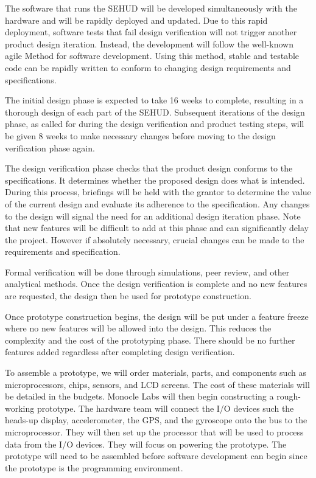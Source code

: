 The software that runs the SEHUD will be developed simultaneously with the
hardware and will be rapidly deployed and updated. Due to this rapid
deployment, software tests that fail design verification will not trigger
another product design iteration. Instead, the development will follow the
well-known agile Method for software development. Using this method, stable
and testable code can be rapidly written to conform to changing design
requirements and specifications.

The initial design phase is expected to take 16 weeks to complete, resulting
in a thorough design of each part of the SEHUD. Subsequent iterations of the
design phase, as called for during the design verification and product
testing steps, will be given 8 weeks to make necessary changes before moving
to the design verification phase again.


The design verification phase checks that the product design conforms to the
specifications. It determines whether the proposed design does what is
intended. During this process, briefings will be held with the grantor to
determine the value of the current design and evaluate its adherence to the
specification. Any changes to the design will signal the need for an
additional design iteration phase. Note that new features will be difficult
to add at this phase and can significantly delay the project. However if
absolutely necessary, crucial changes can be made to the requirements and
specification.

Formal verification will be done through simulations, peer review, and other
analytical methods. Once the design verification is complete and no new
features are requested, the design then be used for prototype construction.


Once prototype construction begins, the design will be put under a feature
freeze where no new features will be allowed into the design. This reduces
the complexity and the cost of the prototyping phase. There should be no
further features added regardless after completing design verification.

To assemble a prototype, we will order materials, parts, and components such
as microprocessors, chips, sensors, and LCD screens. The cost of these
materials will be detailed in the budgets. Monocle Labs will then begin
constructing a rough-working prototype. The hardware team will connect the
I/O devices such the heads-up display, accelerometer, the GPS, and the
gyroscope onto the bus to the microprocessor. They will then set up the
processor that will be used to process data from the I/O devices. They will
focus on powering the prototype. The prototype will need to be assembled
before software development can begin since the prototype is the programming
environment.

